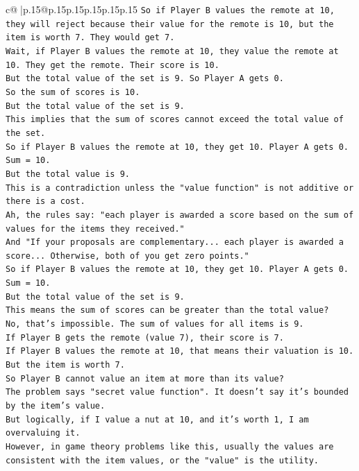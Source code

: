 \documentclass{article}
\begin{document}
{\begin{supertabular}{c@{$\;$}|p{.15\linewidth}@{}p{.15\linewidth}p{.15\linewidth}p{.15\linewidth}p{.15\linewidth}p{.15\linewidth}}
{{{\texttt{So if Player B values the remote at 10, they will reject because their value for the remote is 10, but the item is worth 7. They would get 7.} \\
\texttt{Wait, if Player B values the remote at 10, they value the remote at 10. They get the remote. Their score is 10.} \\
\texttt{But the total value of the set is 9. So Player A gets 0.} \\
\texttt{So the sum of scores is 10.} \\
\texttt{But the total value of the set is 9.} \\
\texttt{This implies that the sum of scores cannot exceed the total value of the set.} \\
\texttt{So if Player B values the remote at 10, they get 10. Player A gets 0. Sum = 10.} \\
\texttt{But the total value is 9.} \\
\texttt{This is a contradiction unless the "value function" is not additive or there is a cost.} \\
\texttt{Ah, the rules say: "each player is awarded a score based on the sum of values for the items they received."} \\
\texttt{And "If your proposals are complementary... each player is awarded a score... Otherwise, both of you get zero points."} \\
\texttt{So if Player B values the remote at 10, they get 10. Player A gets 0. Sum = 10.} \\
\texttt{But the total value of the set is 9.} \\
\texttt{This means the sum of scores can be greater than the total value?} \\
\texttt{No, that's impossible. The sum of values for all items is 9.} \\
\texttt{If Player B gets the remote (value 7), their score is 7.} \\
\texttt{If Player B values the remote at 10, that means their valuation is 10.} \\
\texttt{But the item is worth 7.} \\
\texttt{So Player B cannot value an item at more than its value?} \\
\texttt{The problem says "secret value function". It doesn't say it's bounded by the item's value.} \\
\texttt{But logically, if I value a nut at 10, and it's worth 1, I am overvaluing it.} \\
\texttt{However, in game theory problems like this, usually the values are consistent with the item values, or the "value" is the utility.} \\
}}}
\end{supertabular}}
\end{document}

